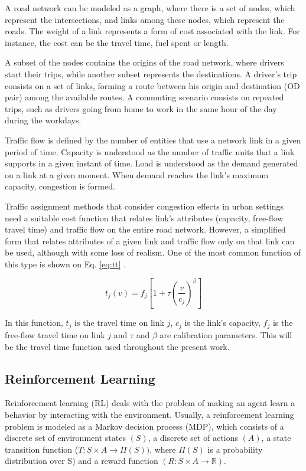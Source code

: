 \documentclass{RITA}
\newcommand{\travTime}{\ensuremath{t_j}} 	%
\newcommand{\fftt}{\ensuremath{f_j}} 		%
\newcommand{\linkCap}{\ensuremath{c_j}}		%
\newcommand{\veh}{\ensuremath{v}}		%
\begin{document}
A road network can be modeled as a graph, where there is a set of nodes, which represent the intersections, and links among these nodes, which represent the roads. The weight of a link represents a form of cost associated with the link. For instance, the cost can be the travel time, fuel spent or length.

A subset of the nodes contains the origins of the road network, where drivers start their trips, while another subset represents the destinations. A driver's trip consists on a set of links, forming a route between his origin and destination (OD pair) among the available routes. A commuting scenario consists on repeated trips, such as drivers going from home to work in the same hour of the day during the workdays.

Traffic flow is defined by the number of entities that use a network link in a given period of time. Capacity is understood as the number of traffic units that a link supports in a given instant of time. Load is understood as the demand generated on a link at a given moment. When demand reaches the link's maximum capacity, congestion is formed.

Traffic assignment methods that consider congestion effects in urban settings need a suitable cost function that relates link's attributes (capacity, free-flow travel time) and traffic flow on the entire road network. However, a simplified form that relates attributes of a  given link and traffic flow only on that link can be used, although with some loss of realism. One of the most common function of this type is shown on Eq. \eqref{eq:tt} \cite{Ortuzar&Willumsen2001}.

\begin{equation}
\label{eq:tt}
\travTime(\veh) = \fftt[1 + \tau \left(\frac{\veh}{\linkCap}\right)^\beta]
\end{equation}

In this function, $\travTime$ is the travel time on link $j$, $\linkCap$ is the link's capacity, $\fftt$ is the free-flow travel time on link $j$ and $\tau$ and $\beta$ are calibration parameters. This will be the travel time function used throughout the present work.

\subsection{Reinforcement Learning}
\label{sec:rl}
Reinforcement learning (RL) deals with the problem of making an agent learn a behavior by interacting with the environment. Usually, a reinforcement learning problem is modeled as a Markov decision process (MDP), which consists of a discrete set of environment states $(S)$, a discrete set of actions $(A)$, a state transition function ($T: S \times A \to \Pi(S))$, where $\Pi(S)$ is a probability distribution over S) and a reward function $(R: S \times A \to \mathbb{R})$. %
\end{document}
